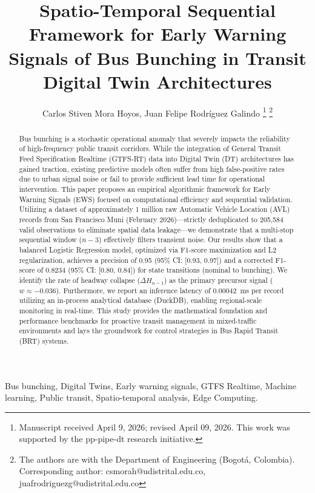\documentclass[journal,twocolumn]{IEEEtran}
\title{Spatio-Temporal Sequential Framework for Early Warning Signals of Bus Bunching in Transit Digital Twin Architectures}
\author{Carlos Stiven Mora Hoyos, Juan Felipe Rodríguez Galindo
\thanks{Manuscript received April 9, 2026; revised April 09, 2026. This work was supported by the pp-pipe-dt research initiative.}
\thanks{The authors are with the Department of Engineering (Bogotá, Colombia). Corresponding author: csmorah@udistrital.edu.co, juafrodriguezg@udistrital.edu.co}}
\begin{document}
\maketitle

\begin{abstract}
	Bus bunching is a stochastic operational anomaly that severely impacts the reliability of high-frequency public transit corridors. While the integration of General Transit Feed Specification Realtime (GTFS-RT) data into Digital Twin (DT) architectures has gained traction, existing predictive models often suffer from high false-positive rates due to urban signal noise or fail to provide sufficient lead time for operational intervention. This paper proposes an empirical algorithmic framework for Early Warning Signals (EWS) focused on computational efficiency and sequential validation. Utilizing a dataset of approximately 1 million raw Automatic Vehicle Location (AVL) records from San Francisco Muni (February 2026)---strictly deduplicated to 205,584 valid observations to eliminate spatial data leakage---we demonstrate that a multi-stop sequential window ($n-3$) effectively filters transient noise. Our results show that a balanced Logistic Regression model, optimized via F1-score maximization and L2 regularization, achieves a precision of 0.95 (95\% CI: [0.93, 0.97]) and a corrected F1-score of 0.8234 (95\% CI: [0.80, 0.84]) for state transitions (nominal to bunching). We identify the rate of headway collapse ($\Delta H_{n-1}$) as the primary precursor signal ($w \approx -0.036$). Furthermore, we report an inference latency of \SI{0.00042}{\ms} per record utilizing an in-process analytical database (DuckDB), enabling regional-scale monitoring in real-time. This study provides the mathematical foundation and performance benchmarks for proactive transit management in mixed-traffic environments and lays the groundwork for control strategies in Bus Rapid Transit (BRT) systems.
\end{abstract}

\begin{IEEEkeywords}
	Bus bunching, Digital Twins, Early warning signals, GTFS Realtime, Machine learning, Public transit, Spatio-temporal analysis, Edge Computing.
\end{IEEEkeywords}
\end{document}
